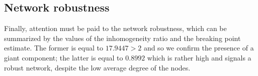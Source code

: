 \documentclass[12pt,a4paper]{article}
\begin{document}
\subsection*{Network robustness}
Finally, attention must be paid to the network robustness, which can be summarized by the values of the inhomogeneity ratio and the breaking point estimate. The former is equal to $17.9447 > 2$ and so we confirm the presence of a giant component; the latter is equal to $0.8992$ which is rather high and signals a robust network, despite the low average degree of the nodes.
 
 
\end{document}

